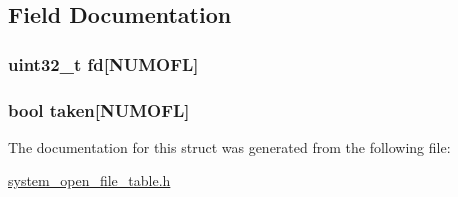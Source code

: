 \subsection{Field Documentation}
\hypertarget{structswoft_a9d67be2cf79bebabe7084963238d6340}{
\subsubsection[{fd}]{\setlength{\rightskip}{0pt plus 5cm}uint32\-\_\-t fd\mbox{[}{\bf N\-U\-M\-O\-F\-L}\mbox{]}}}\label{structswoft_a9d67be2cf79bebabe7084963238d6340}
\hypertarget{structswoft_a7d989b9d4ff7182b0fe7b396fd704a46}{
\subsubsection[{taken}]{\setlength{\rightskip}{0pt plus 5cm}bool taken\mbox{[}{\bf N\-U\-M\-O\-F\-L}\mbox{]}}}\label{structswoft_a7d989b9d4ff7182b0fe7b396fd704a46}


The documentation for this struct was generated from the following file\-:\begin{DoxyCompactItemize}
\item 
\hyperlink{system__open__file__table_8h}{system\-\_\-open\-\_\-file\-\_\-table.\-h}\end{DoxyCompactItemize}
